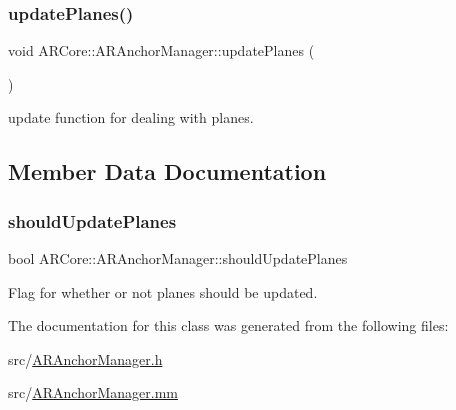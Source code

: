 \mbox{\label{class_a_r_core_1_1_a_r_anchor_manager_aa35c3487e0ba5980ff6b2fb43414bd57}} 
\subsubsection{\texorpdfstring{update\+Planes()}{updatePlanes()}}
{\footnotesize\ttfamily void A\+R\+Core\+::\+A\+R\+Anchor\+Manager\+::update\+Planes (\begin{DoxyParamCaption}{ }\end{DoxyParamCaption})}



update function for dealing with planes. 



\subsection{Member Data Documentation}
\mbox{\label{class_a_r_core_1_1_a_r_anchor_manager_af67de0a611ff8a2786891eabb0ca571f}} 
\subsubsection{\texorpdfstring{should\+Update\+Planes}{shouldUpdatePlanes}}
{\footnotesize\ttfamily bool A\+R\+Core\+::\+A\+R\+Anchor\+Manager\+::should\+Update\+Planes}



Flag for whether or not planes should be updated. 



The documentation for this class was generated from the following files\+:\begin{DoxyCompactItemize}
\item 
src/\mbox{\hyperlink{_a_r_anchor_manager_8h}{A\+R\+Anchor\+Manager.\+h}}\item 
src/\mbox{\hyperlink{_a_r_anchor_manager_8mm}{A\+R\+Anchor\+Manager.\+mm}}\end{DoxyCompactItemize}
